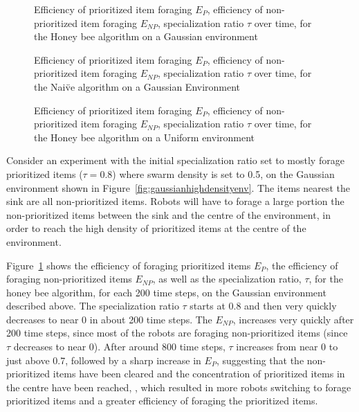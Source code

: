 \begin{figure}[!htb]
\centering
\small
\resizebox{\textwidth}{!}{}
\caption{Efficiency of prioritized item foraging $E_P$, efficiency of non-prioritized item foraging $E_{NP}$, specialization ratio $\tau$ over time, for the Honey bee algorithm on a Gaussian environment}
\label{fig:gaussianhighdensityperformancehoneybee}
\end{figure}

\begin{figure}[!htb]
\centering
\small
\resizebox{\textwidth}{!}{}
\caption{Efficiency of prioritized item foraging $E_P$, efficiency of non-prioritized item foraging $E_{NP}$, specialization ratio $\tau$ over time, for the Nai\"ve algorithm on a Gaussian Environment}
\label{fig:gaussianhighdensityperformanceNa\"ive}
\end{figure}

\begin{figure}[!htb]
\centering
\small
\resizebox{\textwidth}{!}{}
\caption{Efficiency of prioritized item foraging $E_P$, efficiency of non-prioritized item foraging $E_{NP}$, specialization ratio $\tau$ over time, for the Honey bee algorithm on a Uniform environment}
\label{fig:uniformhighdensityperformancehoneybee}
\end{figure}


Consider an experiment with the initial specialization ratio set to mostly forage prioritized items ($\tau=0.8$) where swarm density is set to 0.5, on the Gaussian environment shown in Figure~\ref{fig:gaussianhighdensityenv}. The items nearest the sink are all non-prioritized items. Robots will have to forage a large portion the non-prioritized items between the sink and the centre of the environment, in order to reach the high density of prioritized items at the centre of the environment. 

Figure~\ref{fig:gaussianhighdensityperformancehoneybee} shows the efficiency of foraging prioritized items $E_P$, the efficiency of foraging non-prioritized items $E_{NP}$, as well as the specialization ratio, $\tau$, for the honey bee algorithm, for each 200 time steps, on the Gaussian environment described above. The specialization ratio $\tau$ starts at 0.8 and then very quickly decreases to near 0 in about 200 time steps. The $E_{NP}$, increases very quickly after 200 time steps, since most of the robots are foraging non-prioritized items (since $\tau$ decreases to near 0). After around 800 time steps, $\tau$ increases from near 0 to just above 0.7, followed by a sharp increase in $E_P$, suggesting that the non-prioritized items have been cleared and the concentration of prioritized items in the centre have been reached, , which resulted in more robots switching to forage prioritized items and a greater efficiency of foraging the prioritized items.

